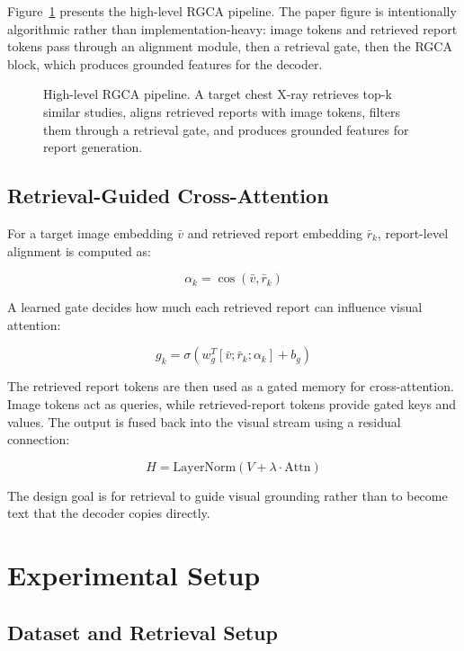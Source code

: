 \documentclass[11pt]{article}
\begin{document}
Figure~\ref{fig:rgca-overview} presents the high-level RGCA pipeline. The paper figure is intentionally algorithmic rather than implementation-heavy: image tokens and retrieved report tokens pass through an alignment module, then a retrieval gate, then the RGCA block, which produces grounded features for the decoder.

\begin{figure}[h]
\centering
{}
\caption{High-level RGCA pipeline. A target chest X-ray retrieves top-k similar studies, aligns retrieved reports with image tokens, filters them through a retrieval gate, and produces grounded features for report generation.}
\label{fig:rgca-overview}
\end{figure}

\subsection{Retrieval-Guided Cross-Attention}

For a target image embedding $\bar{v}$ and retrieved report embedding $\bar{r}_k$, report-level alignment is computed as:

\[
\alpha_k = \cos(\bar{v}, \bar{r}_k)
\]

A learned gate decides how much each retrieved report can influence visual attention:

\[
g_k = \sigma(w_g^T[\bar{v};\bar{r}_k;\alpha_k] + b_g)
\]

The retrieved report tokens are then used as a gated memory for cross-attention. Image tokens act as queries, while retrieved-report tokens provide gated keys and values. The output is fused back into the visual stream using a residual connection:

\[
H = \mathrm{LayerNorm}(V + \lambda \cdot \mathrm{Attn})
\]

The design goal is for retrieval to guide visual grounding rather than to become text that the decoder copies directly.

\section{Experimental Setup}

\subsection{Dataset and Retrieval Setup}
\end{document}
